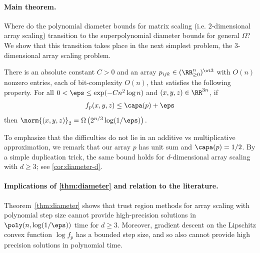 \paragraph{Main theorem.}
Where do the polynomial diameter bounds for matrix scaling (i.e. $2$-dimensional array scaling) transition to the superpolynomial diameter bounds for general $\Omega$? We show that this transition takes place in the next simplest problem, the $3$-dimensional array scaling problem.

\begin{thm}\label{thm:diameter}
There is an absolute constant $C > 0$ and an array $p_{ijk} \in (\RR_{\geq 0}^n)^{\ot 3}$ with $O(n)$ nonzero entries, each of bit-complexity $O(n)$, that satisfies the following property. For all $0 <\eps \leq  \exp(- C n^2 \log n)$ and $(x,y,z) \in \RR^{3n}$, if
	$$f_p (x,y,z) \leq \capa(p) + \eps $$
	then $\norm{(x,y,z)}_2 = \Omega\left(2^{n/3}\log(1/\eps)\right).$
\end{thm}

To emphasize that the difficulties do not lie in an additive vs multiplicative approximation, we remark that our array $p$ has unit sum and $\capa(p) = 1/2$. By a simple duplication trick, the same bound holds for $d$-dimensional array scaling with $d \geq 3$; see \cref{cor:diameter-d}.



\paragraph{Implications of \cref{thm:diameter} and relation to the literature.}

Theorem~\ref{thm:diameter} shows that trust region methods for array scaling with polynomial step size cannot provide high-precision solutions in $\poly(n,\log(1/\eps))$ time for
$d \geq 3$. Moreover, gradient descent on the Lipschitz convex function $\log f_p$ has a bounded step size, and so also cannot provide high precision solutions in polynomial time.

